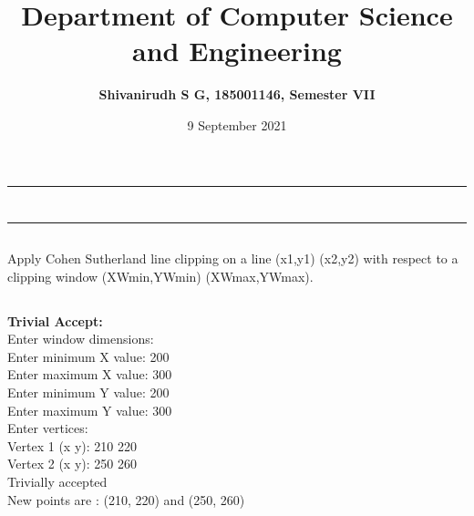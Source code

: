 \documentclass[9pt,letterpaper]{article}
\title{\textbf{Department of Computer Science and Engineering}}
\author{\textbf{Shivanirudh S G, 185001146, Semester VII }}
\date{9 September 2021}
\begin{document}
\maketitle
\hrule
\section*{}
\hrule 
\bigskip\bigskip

\subsection*{}

\subsection*{}
\begin{flushleft}
    Apply Cohen Sutherland line clipping on a line (x1,y1) (x2,y2) with respect to a clipping window (XWmin,YWmin) (XWmax,YWmax). 
\end{flushleft}

\subsection*{}
\begin{flushleft}




\end{flushleft}
\newpage
\subsection*{}
\textbf{Trivial Accept:}\\

Enter window dimensions:  \\
Enter minimum X value: 200 \\
Enter maximum X value: 300 \\
Enter minimum Y value: 200 \\
Enter maximum Y value: 300 \\

Enter vertices:  \\
Vertex 1 (x y): 210 220 \\
Vertex 2 (x y): 250 260 \\
Trivially accepted \\
New points are : (210, 220) and (250, 260) \\
\end{document}
